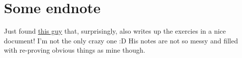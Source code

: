 \documentclass[a4paper]{article}
\begin{document}
\section{Some endnote}

Just found \href{https://wj32.org/wp/wp-content/uploads/2012/12/Introduction-to-Smooth-Manifolds.pdf}{this guy}
that, surprisingly, also writes up the exercies in a nice document!
I'm not the only crazy one :D His notes are not so messy and filled with re-proving
obvious things as mine though.
\end{document}
